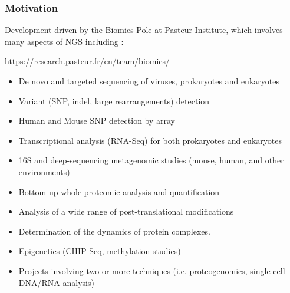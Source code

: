 \documentclass{beamer}
\begin{document}
\begin{frame}
    \frametitle{Motivation}
 
 Development driven by the Biomics Pole at Pasteur Institute, which involves
 many aspects of NGS including :
 
 \tiny
 \begin{block}{https://research.pasteur.fr/en/team/biomics/}
  \begin{itemize}
  \item De novo and targeted sequencing of viruses, prokaryotes and eukaryotes
  \item Variant (SNP, indel, large rearrangements) detection
  \item Human and Mouse SNP detection by array
  \item Transcriptional analysis (RNA-Seq) for both prokaryotes and eukaryotes
  \item 16S and deep-sequencing metagenomic studies (mouse, human, and other environments)
  \item Bottom-up whole proteomic analysis and quantification
  \item Analysis of a wide range of post-translational modifications
  \item Determination of the dynamics of protein complexes.
  \item Epigenetics (CHIP-Seq, methylation studies)
  \item Projects involving two or more techniques (i.e. proteogenomics, single-cell DNA/RNA analysis)
  \end{itemize}
 \end{block}
 \small 
\end{frame}
\end{document}
